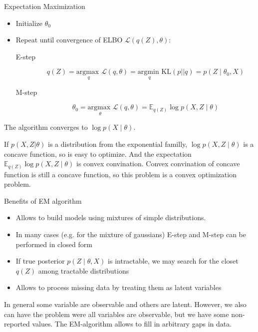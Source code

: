  \begin{algorithm}
    \caption{Expectation Maximization}
    \label{alg:expectationMaximization}
    \begin{itemize}
    \item Initialize $\theta_0$ 
    \item Repeat until convergence of ELBO $\mathcal{L}(q(Z), \theta)$:

        \begin{description}
         \item[E-step]  
         
         \begin{equation}\label{eq:e_step}
          q(Z) = \underset{q}{\text{argmax }} \mathcal{L}(q,\theta) =  \underset{q}{\text{argmin }} \text{KL}(p||q) = p(Z \mid \theta_0 , X)
         \end{equation}
         
         \item[M-step] 
         
         \begin{equation}\label{eq:m_step}
         \theta_0 = \underset{\theta}{\text{argmax }} \mathcal{L}(q,\theta) = \mathbb{E}_{q(Z)} \log p(X,Z \mid \theta)
         \end{equation}
        \end{description}

    \end{itemize}
The algorithm converges to $\log p(X \mid \theta)$.
\end{algorithm}

If $p(X,Z|\theta)$ is a distribution from the exponential familly, $\log p(X, Z \mid \theta)$ is a concave function, so is easy to optimize.
And the expectation $\mathbb{E}_{q(Z)} \log p(X, Z \mid \theta)$ is convex convination.
Convex convination of concave function is still a concave function, so this problem is a convex optimization problem.

\vspace{0.3cm}

Benefits of EM algorithm
\begin{itemize}
 \item Allows to build models using mixtures of simple distributions.
 \item In many cases (e.g. for the mixture of gaussians) E-step and M-step can be performed in closed form
 \item If true posterior $p(Z\mid \theta, X)$ is intractable, we may search for the closet $q(Z)$ among tractable distributions
 \item Allows to process missing data by treating them as latent variables
\end{itemize}

In general some variable are observable and others are latent.
However, we also can have the problem were all variables are observable, but we have some non-reported values.
The EM-algorithm allows to fill in arbitrary gaps in data.



    

